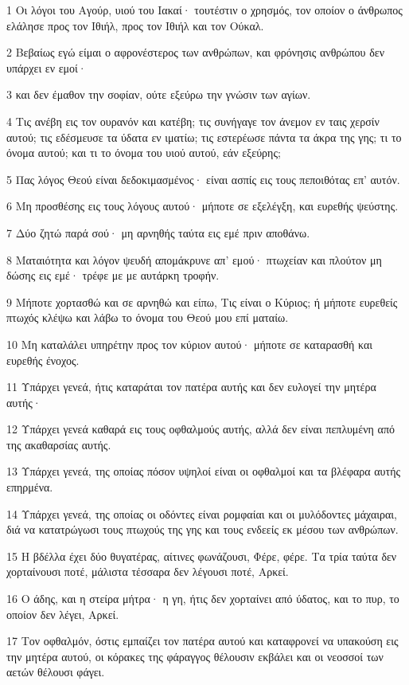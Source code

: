 \par 1 Οι λόγοι του Αγούρ, υιού του Ιακαί· τουτέστιν ο χρησμός, τον οποίον ο άνθρωπος ελάλησε προς τον Ιθιήλ, προς τον Ιθιήλ και τον Ούκαλ.
\par 2 Βεβαίως εγώ είμαι ο αφρονέστερος των ανθρώπων, και φρόνησις ανθρώπου δεν υπάρχει εν εμοί·
\par 3 και δεν έμαθον την σοφίαν, ούτε εξεύρω την γνώσιν των αγίων.
\par 4 Τις ανέβη εις τον ουρανόν και κατέβη; τις συνήγαγε τον άνεμον εν ταις χερσίν αυτού; τις εδέσμευσε τα ύδατα εν ιματίω; τις εστερέωσε πάντα τα άκρα της γης; τι το όνομα αυτού; και τι το όνομα του υιού αυτού, εάν εξεύρης;
\par 5 Πας λόγος Θεού είναι δεδοκιμασμένος· είναι ασπίς εις τους πεποιθότας επ' αυτόν.
\par 6 Μη προσθέσης εις τους λόγους αυτού· μήποτε σε εξελέγξη, και ευρεθής ψεύστης.
\par 7 Δύο ζητώ παρά σού· μη αρνηθής ταύτα εις εμέ πριν αποθάνω.
\par 8 Ματαιότητα και λόγον ψευδή απομάκρυνε απ' εμού· πτωχείαν και πλούτον μη δώσης εις εμέ· τρέφε με με αυτάρκη τροφήν.
\par 9 Μήποτε χορτασθώ και σε αρνηθώ και είπω, Τις είναι ο Κύριος; ή μήποτε ευρεθείς πτωχός κλέψω και λάβω το όνομα του Θεού μου επί ματαίω.
\par 10 Μη καταλάλει υπηρέτην προς τον κύριον αυτού· μήποτε σε καταρασθή και ευρεθής ένοχος.
\par 11 Υπάρχει γενεά, ήτις καταράται τον πατέρα αυτής και δεν ευλογεί την μητέρα αυτής·
\par 12 Υπάρχει γενεά καθαρά εις τους οφθαλμούς αυτής, αλλά δεν είναι πεπλυμένη από της ακαθαρσίας αυτής.
\par 13 Υπάρχει γενεά, της οποίας πόσον υψηλοί είναι οι οφθαλμοί και τα βλέφαρα αυτής επηρμένα.
\par 14 Υπάρχει γενεά, της οποίας οι οδόντες είναι ρομφαίαι και οι μυλόδοντες μάχαιραι, διά να κατατρώγωσι τους πτωχούς της γης και τους ενδεείς εκ μέσου των ανθρώπων.
\par 15 Η βδέλλα έχει δύο θυγατέρας, αίτινες φωνάζουσι, Φέρε, φέρε. Τα τρία ταύτα δεν χορταίνουσι ποτέ, μάλιστα τέσσαρα δεν λέγουσι ποτέ, Αρκεί.
\par 16 Ο άδης, και η στείρα μήτρα· η γη, ήτις δεν χορταίνει από ύδατος, και το πυρ, το οποίον δεν λέγει, Αρκεί.
\par 17 Τον οφθαλμόν, όστις εμπαίζει τον πατέρα αυτού και καταφρονεί να υπακούση εις την μητέρα αυτού, οι κόρακες της φάραγγος θέλουσιν εκβάλει και οι νεοσσοί των αετών θέλουσι φάγει.
